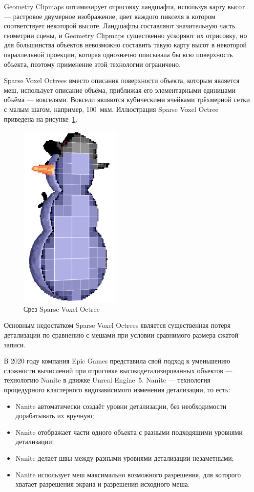 Geometry Clipmaps оптимизирует отрисовку ландшафта, используя карту высот --- растровое двумерное изображение, цвет каждого пикселя в котором соответствует некоторой высоте.
Ландшафты составляют значительную часть геометрии сцены, и Geometry Clipmaps существенно ускоряют их отрисовку, но для большинства объектов невозможно составить такую карту высот в некоторой параллельной проекции, которая однозначно описывала бы всю поверхность объекта, поэтому применение этой технологии ограничено.

Sparse Voxel Octrees вместо описания поверхности объекта, которым является меш, использует описание объёма, приближая его элементарными единицами объёма --- вокселями.
Воксели являются кубическими ячейками трёхмерной сетки с малым шагом, например, 100~мкм.
Иллюстрация Sparse Voxel Octree~\cite{WikipediaSparseVoxelOctreeExample} приведена на рисунке~\ref{fig:SVO-voxel-snowman-slice-01}.

\begin{figure}[H]
    \centering
    \includegraphics[width=5cm]{pics/SVO-voxel-snowman-slice-01.png}
    \caption{Срез Sparse Voxel Octree}
    \label{fig:SVO-voxel-snowman-slice-01}
\end{figure}

Основным недостатком Sparse Voxel Octrees является существенная потеря детализации по сравнению с мешами при условии сравнимого размера сжатой записи.

В 2020 году компания Epic Games представила свой подход к уменьшению сложности вычислений при отрисовке высокодетализированных объектов --- технологию Nanite в движке Unreal Engine~5.
Nanite --- технология процедурного кластерного видозависимого изменения детализации, то есть:
\begin{itemize}
    \item Nanite автоматически создаёт уровни детализации, без необходимости дорабатывать их вручную;
    \item Nanite отображает части одного объекта с разными подходящими уровнями детализации;
    \item Nanite делает швы между разными уровнями детализации незаметными;
    \item Nanite использует меш максимально возможного разрешения, для которого хватает разрешения экрана и разрешения исходного меша.
\end{itemize}

